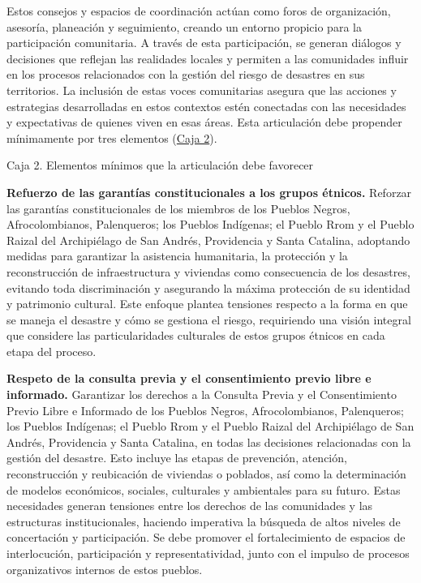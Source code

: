 \documentclass[
  spanish,
  letterpaper,
]{book}
\begin{document}
Estos consejos y espacios de coordinación actúan como foros de
organización, asesoría, planeación y seguimiento, creando un entorno
propicio para la participación comunitaria. A través de esta
participación, se generan diálogos y decisiones que reflejan las
realidades locales y permiten a las comunidades influir en los procesos
relacionados con la gestión del riesgo de desastres en sus territorios.
La inclusión de estas voces comunitarias asegura que las acciones y
estrategias desarrolladas en estos contextos estén conectadas con las
necesidades y expectativas de quienes viven en esas áreas. Esta
articulación debe propender mínimamente por tres elementos
(\hyperref[box2]{Caja 2}).

\begin{tcolorbox}[enhanced jigsaw, rightrule=.15mm, colframe=quarto-callout-important-color-frame, opacityback=0, arc=.35mm, bottomrule=.15mm, toprule=.15mm, breakable, colback=white, leftrule=.75mm, left=2mm]

Caja 2. Elementos mínimos que la articulación debe favorecer

\textbf{Refuerzo de las garantías constitucionales a los grupos
étnicos.} Reforzar las garantías constitucionales de los miembros de los
Pueblos Negros, Afrocolombianos, Palenqueros; los Pueblos Indígenas; el
Pueblo Rrom y el Pueblo Raizal del Archipiélago de San Andrés,
Providencia y Santa Catalina, adoptando medidas para garantizar la
asistencia humanitaria, la protección y la reconstrucción de
infraestructura y viviendas como consecuencia de los desastres, evitando
toda discriminación y asegurando la máxima protección de su identidad y
patrimonio cultural. Este enfoque plantea tensiones respecto a la forma
en que se maneja el desastre y cómo se gestiona el riesgo, requiriendo
una visión integral que considere las particularidades culturales de
estos grupos étnicos en cada etapa del proceso.

\textbf{Respeto de la consulta previa y el consentimiento previo libre e
informado.} Garantizar los derechos a la Consulta Previa y el
Consentimiento Previo Libre e Informado de los Pueblos Negros,
Afrocolombianos, Palenqueros; los Pueblos Indígenas; el Pueblo Rrom y el
Pueblo Raizal del Archipiélago de San Andrés, Providencia y Santa
Catalina, en todas las decisiones relacionadas con la gestión del
desastre. Esto incluye las etapas de prevención, atención,
reconstrucción y reubicación de viviendas o poblados, así como la
determinación de modelos económicos, sociales, culturales y ambientales
para su futuro. Estas necesidades generan tensiones entre los derechos
de las comunidades y las estructuras institucionales, haciendo
imperativa la búsqueda de altos niveles de concertación y participación.
Se debe promover el fortalecimiento de espacios de interlocución,
participación y representatividad, junto con el impulso de procesos
organizativos internos de estos pueblos.


\end{tcolorbox}
\end{document}
